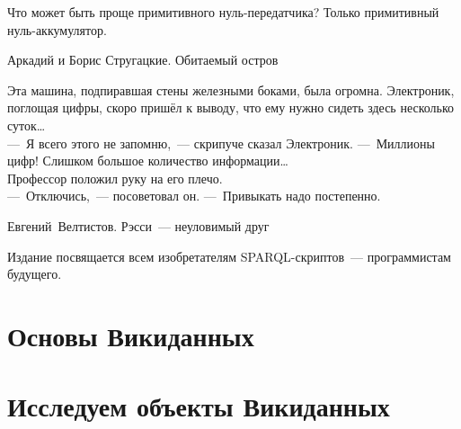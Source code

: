 \documentclass[nofonts,justified,nobib,openany]{tufte-book}%
\theoremstyle{definition}
\begin{document}
\clearpage
\vfill
\begin{fullwidth}

\makeatletter\setlength\hsize{\@tufte@fullwidth}\makeatother

\renewcommand{\epigraphsize}{\Large}
\renewcommand{\epigraphflush}{flushright}
\setlength{\epigraphwidth}{.7\linewidth}

\epigraph{Что может быть проще примитивного нуль-передатчика? Только примитивный нуль-аккумулятор.}{%
Аркадий и Борис Стругацкие. Обитаемый остров}

\vspace{36px}

\epigraph{%
Эта машина, подпиравшая стены железными боками, была огромна. Электроник, поглощая цифры, скоро пришёл к выводу, что ему нужно сидеть здесь несколько суток\dots\\
---~Я всего этого не запомню,~--- скрипуче сказал Электроник. ---~Миллионы цифр! Слишком большое количество информации\dots\\
Профессор положил руку на его плечо.\\
---~Отключись,~--- посоветовал он. ---~Привыкать надо постепенно.%
}{\mbox{Евгений Велтистов}. Рэсси~--- неуловимый друг}
\vspace{36px}


\setlength{\epigraphrule}{0pt} %
\epigraph{%
Издание посвящается всем изобретателям SPARQL-скриптов~--- программистам будущего.
}{}
\end{fullwidth}





\mainmatter







\part{Основы Викиданных}
\label{part:foundation}







\part{Исследуем объекты Викиданных}
\label{part:research}
\end{document}
